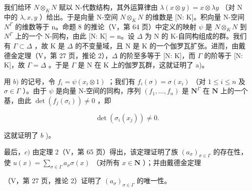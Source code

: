 我们给环 \(N \otimes_{K} N\) 赋以 N-代数结构，其外运算律由 \(\lambda(x \otimes y) = x \otimes \lambda y\) （对 N 中的 \(\lambda, x, y\) ）给出。于是向量 N-空间 \(N \otimes_{K} N\) 的维数是 {[}N: K{]}。积向量 N-空间 \(N^{\Gamma}\) 的维数等于 n。命题 8 的推论（V，第 64 页）中定义的映射 \(\psi\) 是 \(N \otimes_{K} N\) 到 \(N^{\Gamma}\) 上的一个 N-同构，由此 {[}N: K{]} = n。设 \(\Delta\) 为 N 的 K-自同构组成的群。我们有 \(\Gamma \subset \Delta\) ，故 K 是 \(\Delta\) 的不变量域，且 N 是 K 的一个伽罗瓦扩张。进而，由戴德金定理（V，第 27 页，推论 2），\(\Delta\) 的阶至多等于 {[}N: K{]}，而 \(\Gamma\) 的阶等于 {[}N: K{]}，故 \(\Gamma = \Delta\) 。于是 \(\Gamma\) 是 N 在 K 上的伽罗瓦群，这就证明了 a)。

用 \(b)\) 的记号，令 \(f_{i} = \psi(x_{i} \otimes 1)\) ；我们有 \(f_{i}(\sigma) = \sigma(x_{i})\) （对 \(1 \leqslant i \leqslant n\) 及 \(\sigma \in \Gamma\) ）。由于 \(\psi\) 是向量 N-空间的同构，序列 \((f_{1}, \ldots, f_{n})\) 是 \(\mathbf{N}^{\Gamma}\) 在 \(\mathbf{N}\) 上的一个基，由此 \(\det(f_{j}(\sigma_{i})) \neq 0\) ，即

\[
\det \left(\sigma_ {i} (x _ {j})\right) \neq 0.
\]

这就证明了 \(b\) )。

最后，\(c)\) 由定理 2（V，第 65 页）得出，该定理证明了族 \((a_{\sigma})_{\sigma \in \Gamma}\) 的存在性，使 \(u(x) = \sum_{\sigma \in \Gamma} a_{\sigma} \sigma(x)\) （对所有 \(x \in \mathbf{N}\) ）；并由戴德金定理

（V，第 27 页，推论 2）证明了 \((a_{\sigma})_{\sigma \in \Gamma}\) 的唯一性。

